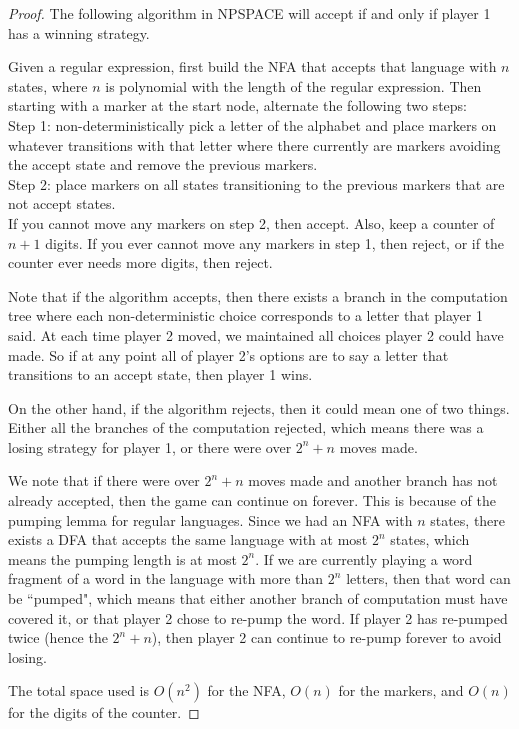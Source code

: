 \documentclass[runningheads,a4paper]{llncs}
\begin{document}
\begin{proof}
The following algorithm in NPSPACE will accept if and only if player 1 has a winning strategy.

Given a regular expression, first build the NFA that accepts that language with $n$ states, where $n$ is polynomial with the length of the regular expression. Then starting with a marker at the start node, alternate the following two steps:\\
Step 1: non-deterministically pick a letter of the alphabet and place markers on whatever transitions with that letter where there currently are markers avoiding the accept state and remove the previous markers. \\
Step 2: place markers on all states transitioning to the previous markers that are not accept states. \\
If you cannot move any markers on step 2, then accept. Also, keep a counter of $n+1$ digits. If you ever cannot move any markers in step 1, then reject, or if the counter ever needs more digits, then reject.

Note that if the algorithm accepts, then there exists a branch in the computation tree where each non-deterministic choice corresponds to a letter that player 1 said. At each time player 2 moved, we maintained all choices player 2 could have made. So if at any point all of player 2's options are to say a letter that transitions to an accept state, then player 1 wins. 

On the other hand, if the algorithm rejects, then it could mean one of two things. Either all the branches of the computation rejected, which means there was a losing strategy for player 1, or there were over $2^n+n$ moves made. 

We note that if there were over $2^n+n$ moves made and another branch has not already accepted, then the game can continue on forever. This is because of the pumping lemma for regular languages. Since we had an NFA with $n$ states, there exists a DFA that accepts the same language with at most $2^n$ states, which means the pumping length is at most $2^n$. If we are currently playing a word fragment of a word in the language with more than $2^n$ letters, then that word can be ``pumped", which means that either another branch of computation must have covered it, or that player 2 chose to re-pump the word. If player 2 has re-pumped twice (hence the $2^n + n$), then player 2 can continue to re-pump forever to avoid losing. 

The total space used is $O(n^2)$ for the NFA, $O(n)$ for the markers, and $O(n)$ for the digits of the counter. 
\end{proof}
\end{document}
